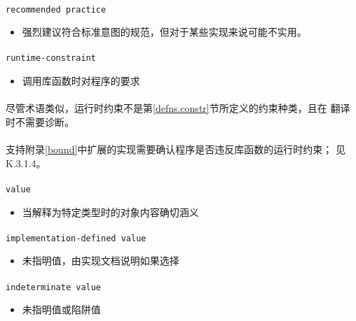 \paragraph{}
\texttt{recommended practice}
\begin{itemize}
  \item[]{强烈建议符合标准意图的规范，但对于某些实现来说可能不实用。}
\end{itemize}

\paragraph{}
\texttt{runtime-constraint}
\begin{itemize}
  \item[]{调用库函数时对程序的要求}
\end{itemize}

\paragraph{}
\notes 尽管术语类似，运行时约束不是第\ref{defns.constr}节所定义的约束种类，且在
翻译时不需要诊断。

\paragraph{}
\notes 支持附录\ref{bound}中扩展的实现需要确认程序是否违反库函数的运行时约束；
见K.3.1.4。

\paragraph{}
\texttt{value}
\begin{itemize}
  \item[]{当解释为特定类型时的对象内容确切涵义}
\end{itemize}

\paragraph{}
\texttt{implementation-defined value}
\begin{itemize}
  \item[]{未指明值，由实现文档说明如果选择}
\end{itemize}

\paragraph{}
\texttt{indeterminate value}
\begin{itemize}
  \item[]{未指明值或陷阱值}
\end{itemize}

